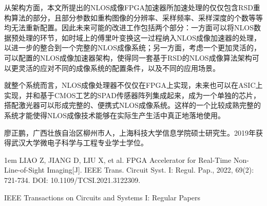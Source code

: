 \documentclass[master]{shtthesis}             %
\makeatletter
\def\ifgraduate{\ifsht@graduate}
\makeatother
\begin{document}
从架构方面，本文所提出的NLOS成像FPGA加速器所加速处理的仅仅包含RSD重构算法的部分，且部分参数如重构图像的分辨率、采样频率、采样深度的个数等等均无法重新配置。因此未来可能的改进工作包括两个部分：一方面可以将NLOS数据预处理的环节，如时域上的傅里叶变换这一过程纳入NLOS成像加速器的处理，以进一步的整合到一个完整的NLOS成像系统；另一方面，考虑一个更加灵活的，可以配置的NLOS成像加速器架构，使得同一套基于RSD的NLOS成像算法架构可以更灵活的应对不同的成像系统的配置条件，以及不同的应用场景。

就整个系统而言，NLOS成像处理器不仅仅在FPGA上实现，未来也可以在ASIC上实现，并和基于CMOS工艺的SPAD传感器阵列集成起来，成为一个单独的芯片，搭配激光器可以形成完整的、便携式NLOS成像系统。这样的一个比较成熟完整的系统才能使得NLOS成像技术能够在实际生产生活中真正地落地使用。%

\makebiblio


\backmatter
\begin{acknowledgement}
\end{acknowledgement}

\ifgraduate
\begin{resume}
  廖正鹏，广西壮族自治区柳州市人，上海科技大学信息学院硕士研究生。2019年获得武汉大学微电子科学与工程专业学士学位。
\end{resume}

\begin{publications}
  \hangindent 1em
  \noindent
  LIAO Z, JIANG D, LIU X, et al. FPGA Accelerator for Real-Time Non-Line-of-Sight Imaging[J]. IEEE Trans. Circuit Syst. I: Regul. Pap., 2022, 69(2): 721-734. DOI: 10.1109/TCSI.2021.3122309.

\end{publications}

\begin{publications*}
  IEEE Transactions on Circuits and Systems I: Regular Papers
\end{publications*}



\fi
\end{document}
